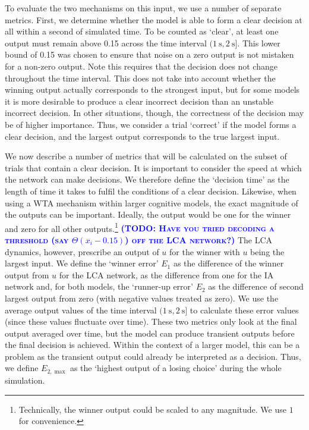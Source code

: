 \documentclass[10pt,letterpaper]{article}
\makeatletter
\newcommand{\todo}[1]{\textbf{\textsc{\textcolor{blue}{(TODO\@: #1)}}}}
\makeatother
\begin{document}
To evaluate the two mechanisms on this input, we use a number of separate metrics.
First, we determine whether the model is able to form a clear decision at all within a second of simulated time.
To be counted as `clear', at least one output must remain above 0.15 across the time interval $(\SI{1}{\second}, \SI{2}{\second}]$. %
This lower bound of 0.15 was chosen to ensure that noise on a zero output is not mistaken for a non-zero output.
Note this requires that the decision does not change throughout the time interval.
This does not take into account whether the winning output actually corresponds to the strongest input, but for some models it is more desirable to produce a clear incorrect decision than an unstable incorrect decision.
In other situations, though, the correctness of the decision may be of higher importance.
Thus, we consider a trial `correct' if the model forms a clear decision, and the largest output corresponds to the true largest input.

We now describe a number of metrics that will be calculated on the subset of trials that contain a clear decision.
It is important to consider the speed at which the network can make decisions.
We therefore define the `decision time' as the length of time it takes to fulfil the conditions of a clear decision.
Likewise, when using a WTA mechanism within larger cognitive models, the exact magnitude of the outputs can be important.
Ideally, the output would be one for the winner and zero for all other outputs.\footnote{Technically, the winner output could be scaled to any magnitude.
We use $1$ for convenience.}
\todo{Have you tried decoding a threshold (say $\Theta(x_i - 0.15)$) off the LCA network?}
The LCA dynamics, however, prescribe an output of $u$ for the winner with $u$ being the largest input.
We define the `winner error' $E_1$ as the difference of the winner output from $u$ for the LCA network, as the difference from one for the IA network and, for both models, the `runner-up error' $E_2$ as the difference of second largest output from zero (with negative values treated as zero).
We use the average output values of the time   interval $(\SI{1}{\second}, \SI{2}{\second}]$ to calculate these error values (since these values fluctuate over time).
These two metrics only look at the final output averaged over time, but the model can produce transient outputs before the final decision is achieved.
Within the context of a larger model, this can be a problem as the transient output could already be interpreted as a decision.
Thus, we define $E_{2,\max}$ as the `highest output of a losing choice' during the whole simulation.
\end{document}
